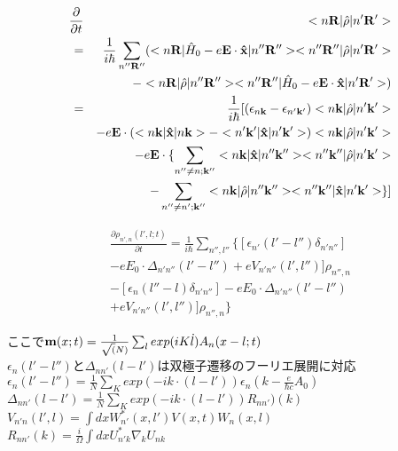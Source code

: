 \documentclass[aps,prb,reprint]{revtex4-1}
\begin{document}
\begin{eqnarray*}
\frac{ \partial }{\partial t } &&<n{\bf R}| \hat{\rho} |n'{\bf R'}> \\
= && \frac{1}{i \hbar}  \sum_{n''{\bf R''}} ( <n{\bf R}| \hat{H}_0 -e{\bf E} \cdot {\bf \hat{x}} |n''{\bf R''}><n''{\bf R''}| \hat{\rho} |n'{\bf R'}> \\
&&- <n{\bf R}| \hat{\rho} |n''{\bf R''}><n''{\bf R''}| \hat{H}_0 -e{\bf E} \cdot {\bf \hat{x}}  |n'{\bf R'}> )\\
= &&\frac{1}{i \hbar} [ (\epsilon_{n{\bf k}}-\epsilon_{n'{\bf k'}}) <n{\bf k}| \hat{\rho} |n'{\bf k'}> \\
&& -e{\bf E} \cdot(<n{\bf k}| {\bf \hat{x}} |n{\bf k}> - <n'{\bf k'}| {\bf \hat{x}} |n'{\bf k'}> ) <n{\bf k}| \hat{\rho} |n'{\bf k'}>\\ 
&&-e{\bf E} \cdot \{ \sum_{n'' \neq n; {\bf k''}} <n{\bf k}| {\bf \hat{x}} |n''{\bf k''}> <n''{\bf k''}| \hat{\rho} |n'{\bf k'}> \\
&&- \sum_{n'' \neq n'; {\bf k''}} <n{\bf k}| \hat{\rho} |n''{\bf k''}> <n''{\bf k''}| {\bf \hat{x}} |n'{\bf k'}> \} ]\\
\end{eqnarray*}

\begin{eqnarray*}
\frac{ \partial \rho_{n',n}(l', l; t) }{\partial t } = \frac{1}{i \hbar} \sum_{n'',l''} \{ [ \epsilon_{n'}(l'-l'') \delta_{n'n''} ] \\
- eE_0 \cdot \Delta_{n'n''}(l'-l'') + eV_{n'n''}(l', l'')] \rho_{n'',n}\\
- [ \epsilon_{n}(l''-l) \delta_{n'n''} ] - eE_0 \cdot \Delta_{n'n''}(l'-l'') \\
+ eV_{n'n''}(l', l'')] \rho_{n'',n} \}
\end{eqnarray*}

ここで${\bf m}(x;t) = \frac{1}{\sqrt (N)} \sum_{l} exp(iK \dot l) A_n(x-l; t)$\\
$\epsilon_{n}(l'-l'')$と$\Delta_{nn'}(l-l')$は双極子遷移のフーリエ展開に対応\\
$\epsilon_{n}(l'-l'') =\frac{1}{N} \sum_K exp(-ik \cdot (l-l') ) \epsilon_n(k-\frac{e}{\hbar c}A_0)$\\
$\Delta_{nn'}(l-l')=\frac{1}{N}\sum_K exp(-ik \cdot (l-l') ) R_{nn'})(k) $\\
$V_{n'n}(l',l)= \int dx W^*_{n'}(x,l') V(x,t) W_n (x,l) $\\
$R_{nn'}(k) = \frac{i}{\Omega} \int dx U^*_{n'k} \nabla_k U_{nk}$\\
\end{document}
